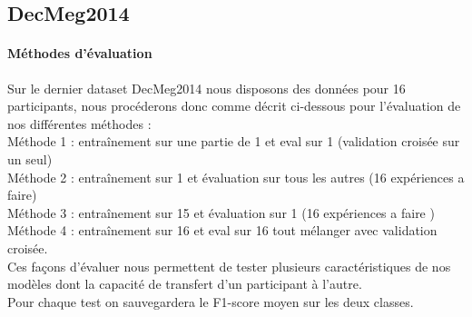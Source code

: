 \documentclass{article}[12pt]
\begin{document}
\subsection{DecMeg2014}

\paragraph{Méthodes d'évaluation}

Sur le dernier dataset DecMeg2014 nous disposons des données pour 16 participants, nous procéderons donc comme décrit ci-dessous pour l'évaluation de nos différentes méthodes :\\
Méthode 1 : entraînement sur une partie de 1 et eval sur 1 (validation croisée sur un seul)\\
Méthode 2 : entraînement sur 1 et évaluation sur tous les autres (16 expériences a faire)\\
Méthode 3 : entraînement sur 15 et évaluation sur 1 (16 expériences a faire )\\
Méthode 4 : entraînement sur 16 et eval sur 16 tout mélanger avec validation croisée.
\\
Ces façons d'évaluer nous permettent de tester plusieurs caractéristiques de nos modèles dont la capacité de transfert d'un participant à l'autre.
\\
Pour chaque test on sauvegardera le F1-score moyen sur les deux classes.
\\
\end{document}

